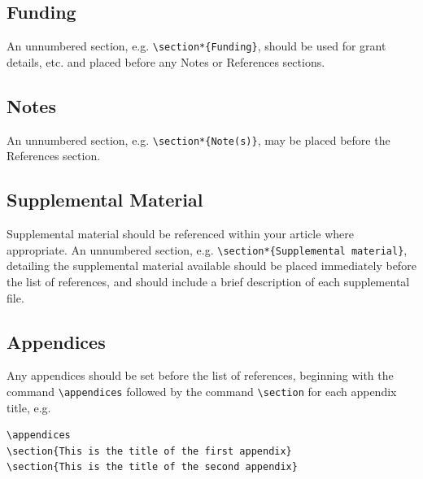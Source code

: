 \documentclass{tATO2e}
\begin{document}
\subsection{Funding}

An unnumbered section, e.g. \verb"\section*{Funding}", should be used for grant details, etc.
and placed before any Notes or References sections.


\subsection{Notes}

An unnumbered section, e.g. \verb"\section*{Note(s)}", may be placed before the References section.


\subsection{Supplemental Material}

Supplemental material should be referenced within your article where appropriate. An unnumbered section, e.g. \verb"\section*{Supplemental material}", detailing the supplemental material available should be placed immediately before the list of references, and should include a brief description of each supplemental file.


\subsection{Appendices}

Any appendices should be set before the list of references, beginning with the
command \verb"\appendices" followed by the command \verb"\section"
for each appendix title, e.g.

\begin{verbatim}
\appendices
\section{This is the title of the first appendix}
\section{This is the title of the second appendix}
\end{verbatim}
\end{document}
